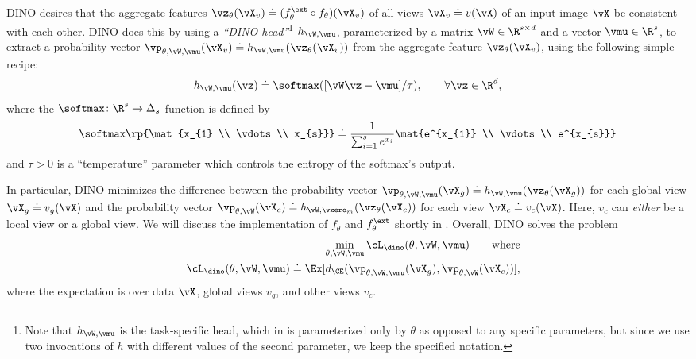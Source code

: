 \documentclass[../../book-main.tex]{subfiles}
\begin{document}
DINO desires that the aggregate features \(\vz_{\theta}(\vX_{v})
\doteq (f_{\theta}^{\ext} \circ f_{\theta})(\vX_{v})\) of all views
\(\vX_{v} \doteq v(\vX)\) of an input image \(\vX\) be consistent
with each other. DINO does this by using a \textit{``DINO
head''}\footnote{Note that \(h_{\vW, \vmu}\) is the task-specific
    head, which in  is parameterized only by
    \(\theta\) as opposed to any specific parameters, but since we use
    two invocations of \(h\) with different values of the second
parameter, we keep the specified notation.} \(h_{\vW, \vmu}\),
parameterized by a matrix \(\vW \in \R^{s \times d}\) and a vector
\(\vmu \in \R^{s}\), to extract a probability vector \(\vp_{\theta,
\vW, \vmu}(\vX_{v}) \doteq h_{\vW, \vmu}(\vz_{\theta}(\vX_{v}))\)
from the aggregate feature \(\vz_{\theta}(\vX_{v})\), using the
following simple recipe:
\begin{equation}
    h_{\vW, \vmu}(\vz) \doteq \softmax([\vW\vz - \vmu]/\tau), \qquad
    \forall \vz \in \R^{d},
\end{equation}
where the \(\softmax \colon \R^{s} \to \Delta_{s}\) function is defined by
\begin{equation}
    \softmax\rp{\mat{x_{1} \\ \vdots \\ x_{s}}} \doteq
    \frac{1}{\sum_{i = 1}^{s}e^{x_{i}}}\mat{e^{x_{1}} \\ \vdots \\ e^{x_{s}}}
\end{equation}
and \(\tau > 0\) is a ``temperature'' parameter which controls the
entropy of the softmax's output.

In particular, DINO minimizes the difference between the probability
vector \(\vp_{\theta, \vW, \vmu}(\vX_{g}) \doteq h_{\vW,
\vmu}(\vz_{\theta}(\vX_{g}))\) for each global view \(\vX_{g} \doteq
v_{g}(\vX)\) and the probability vector \(\vp_{\theta, \vW}(\vX_{c})
\doteq h_{\vW, \vzero_{m}}(\vz_{\theta}(\vX_{c}))\) for each view
\(\vX_{c} \doteq v_{c}(\vX)\). Here, \(v_{c}\) can \textit{either} be
a local view or a global view. We will discuss the implementation of
\(f_{\theta}\) and \(f_{\theta}^{\ext}\) shortly in
. Overall, DINO solves the problem
\begin{eqnarray}
    &&\min_{\theta, \vW, \vmu}\cL_{\dino}(\theta, \vW, \vmu) \qquad
    \text{where} \nonumber \\
    &&\cL_{\dino}(\theta, \vW, \vmu) \doteq \Ex[d_{\CE}(\vp_{\theta,
    \vW, \vmu}(\vX_{g}), \vp_{\theta, \vW}(\vX_{c}))],\label{eq:dino_loss}
\end{eqnarray}
where the expectation is over data \(\vX\), global views \(v_{g}\),
and other views \(v_{c}\).
\end{document}
